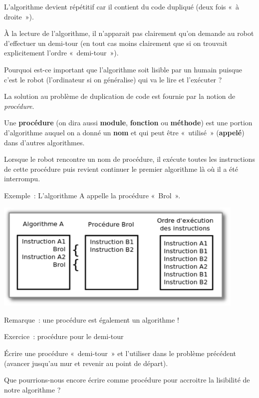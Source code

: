 	\begin{liste}
	\item 
		L'algorithme devient répétitif car il contient du code dupliqué
		(deux fois «~à droite~»).
	\item 
		À la lecture de l'algorithme, 
		il n'apparait pas clairement qu'on demande au robot 
		d'effectuer un demi-tour
		(en tout cas moins clairement que si on trouvait explicitement
		l'ordre «~demi-tour~»).
	\end{liste}

	Pourquoi est-ce important que l'algorithme soit lisible
	par un humain puisque c'est le robot
	(l'ordinateur si on généralise) qui va le lire et
	l'exécuter ?

	La solution au problème de duplication de code est fournie par la notion
	de \textit{procédure}.

	Une \textbf{procédure} (on dira aussi \textbf{module}, \textbf{fonction}
	ou \textbf{méthode}) est une portion d'algorithme
	auquel on a donné un \textbf{nom} et qui peut être «~utilisé~»
	(\textbf{appelé}) dans d'autres algorithmes.

	Lorsque le robot rencontre un nom de procédure, il exécute toutes les
	instructions de cette procédure puis revient continuer le premier
	algorithme là où il a été interrompu.

	Exemple~: L'algorithme A appelle la procédure «~Brol~».

	\begin{center}
	\includegraphics[width=0.9\textwidth]{image/robot-procedure}
	
	{Remarque~: une procédure est également un algorithme !}
	\end{center}

	
	\begin{Emphase}[exercice]{Exercice~: procédure pour le demi-tour}
	
		Écrire une procédure «~demi-tour~» et l'utiliser dans
		le problème précédent (avancer jusqu'au mur et revenir
		au point de départ).
		
		Que pourrions-nous encore écrire comme procédure pour accroitre
		la lisibilité de notre algorithme ?

	\end{Emphase}

